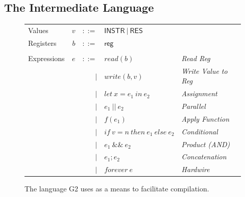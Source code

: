 \documentclass[sigconf,usenames,dvipsnames,svgnames,table]{acmart}
\def \sysname {\textsc{G2}\xspace}
\begin{document}
    \subsection{The Intermediate Language}\label{sec:comp:int}

      \begin{figure}
        \centering
        \begin{tabular}{l r r l l}
          Values        & $v$     & $::=$     & $\mathsf{INSTR\ |\ RES}$ &\\
          Registers     & $b$     & $::=$     & $\mathsf{reg}$           &\\
          \\
          Expressions & $e$ & $::=$  & $read(b)$       
                            & \textit{Read Reg}\\
                      &     & $\mid$ & $write(b,v)$    
                            & \textit{Write Value to Reg}\\
                      &     & $\mid$ & $let\ x = e_1\ in\ e_2$ 
                            & \textit{Assignment}\\  
                      &     & $\mid$ & $e_1\ ||\ e_2$ 
                            & \textit{Parallel}\\
                      &     & $\mid$ & $f(e_1)$        
                            & \textit{Apply Function} \\  
                      &     & $\mid$ & $if\ v = n\ then\ e_1\ else\ e_2$
                            & \textit{Conditional} \\
                      &     & $\mid$ & $e_1\ \&\&\ e_2$ 
                            & \textit{Product (AND)}\\
                      &     & $\mid$ & $e_1 ; e_2$
                            & \textit{Concatenation}\\
                      &     & $\mid$ & $forever\ e$ 
                            & \textit{Hardwire}
        \end{tabular}
        \caption{The language \sysname uses as a means to facilitate compilation.}
        \label{fig:comp:int}
      \end{figure}
\end{document}

